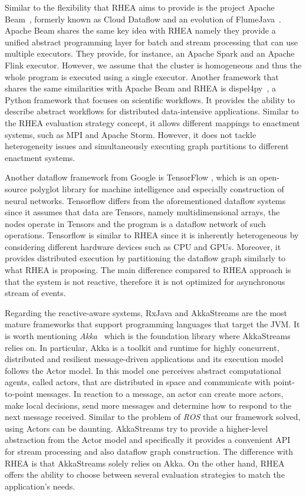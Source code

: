 \documentclass[sigplan,screen,10pt]{acmart}
\begin{document}
Similar to the flexibility that \textsc{RHEA} aims to provide is the project
Apache Beam~\cite{DBLP:journals/pvldb/AkidauBCCFLMMPS15}, formerly known as Cloud Dataflow and an evolution of FlumeJava~\cite{flumejava}.
Apache Beam shares the same key idea with \textsc{RHEA} namely they provide a
unified abstract programming layer for batch and stream processing that can use
multiple executors. They provide, for instance, an Apache Spark and an Apache Flink
executor. However, we assume that the cluster is homogeneous and thus the whole
program is executed using a single executor. Another framework that shares the
same similarities with Apache Beam and RHEA is dispel4py~\cite{dispel4py}, a Python
framework that focuses on scientific workflows. It provides the ability
to describe abstract workflows for distributed data-intensive applications.
Similar to the \textsc{RHEA} evaluation strategy concept, it allows different mappings
to enactment systems, such as MPI and Apache Storm. However, it does not tackle
heterogeneity issues and simultaneously executing graph partitions to different
enactment systems.

Another dataflow framework from Google is TensorFlow \cite{tensorflow},
which is an open-source polyglot library for machine intelligence and especially
construction of neural networks. Tensorflow differs from the aforementioned dataflow
systems since it assumes that data are Tensors, namely multidimensional arrays,
the nodes operate in Tensors and the program is a dataflow network of such operations.
Tensorflow is similar to \textsc{RHEA} since it is inherently heterogeneous by
considering different hardware devices such as CPU and GPUs. Moreover, it provides
distributed execution by partitioning the dataflow graph similarly to what \textsc{RHEA}
is proposing. The main difference compared to \textsc{RHEA} approach is that the
system is not reactive, therefore it is not optimized for asynchronous stream of
events.

Regarding the reactive-aware systems, RxJava and AkkaStreams are the most mature
frameworks that support programming languages that target the JVM. It is worth
mentioning \textit{Akka}~ which is the foundation library
where AkkaStreams relies on. In particular, Akka is a toolkit and runtime for highly
concurrent, distributed and resilient message-driven applications and its execution
model follows the Actor model. In this model one perceives abstract computational
agents, called actors, that are distributed in space and communicate with
point-to-point messages. In reaction to a message, an actor can create more actors,
make local decisions, send more messages and determine how to respond to the next
message received. Similar to the problem of \textit{ROS} that our framework solved,
using Actors can be daunting. AkkaStreams try to provide a higher-level abstraction
from the Actor model and specifically it provides a convenient API for stream
processing and also dataflow graph construction.
The difference with \textsc{RHEA} is that AkkaStreams solely relies on Akka. On the
other hand, \textsc{RHEA} offers the ability to choose between several
evaluation strategies to match the application's needs.
\end{document}
